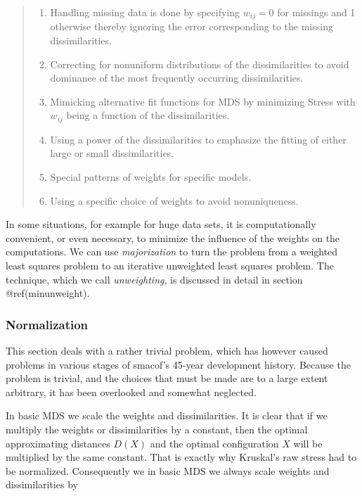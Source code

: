 \documentclass[
  12pt,
  letterpaper,
  DIV=11,
  numbers=noendperiod]{scrreprt}
\providecommand{\tightlist}{%
  \setlength{\itemsep}{0pt}\setlength{\parskip}{0pt}}\usepackage{longtable,booktabs,array}
\theoremstyle{remark}
\begin{document}
\begin{quote}
\begin{enumerate}
\def\labelenumi{\arabic{enumi}.}
\tightlist
\item
  Handling missing data is done by specifying \(w_{ij} = 0\) for
  missings and 1 otherwise thereby ignoring the error corresponding to
  the missing dissimilarities.
\item
  Correcting for nonuniform distributions of the dissimilarities to
  avoid dominance of the most frequently occurring dissimilarities.
\item
  Mimicking alternative fit functions for MDS by minimizing Stress with
  \(w_{ij}\) being a function of the dissimilarities.
\item
  Using a power of the dissimilarities to emphasize the ﬁtting of either
  large or small dissimilarities.
\item
  Special patterns of weights for speciﬁc models.
\item
  Using a speciﬁc choice of weights to avoid nonuniqueness.
\end{enumerate}
\end{quote}

In some situations, for example for huge data sets, it is
computationally convenient, or even necessary, to minimize the influence
of the weights on the computations. We can use \emph{majorization} to
turn the problem from a weighted least squares problem to an iterative
unweighted least squares problem. The technique, which we call
\emph{unweighting}, is discussed in detail in section @ref(minunweight).

\subsubsection{Normalization}\label{intronorm}

This section deals with a rather trivial problem, which has however
caused problems in various stages of smacof's 45-year development
history. Because the problem is trivial, and the choices that must be
made are to a large extent arbitrary, it has been overlooked and
somewhat neglected.

In basic MDS we scale the weights and dissimilarities. It is clear that
if we multiply the weights or dissimilarities by a constant, then the
optimal approximating distances \(D(X)\) and the optimal configuration
\(X\) will be multiplied by the same constant. That is exactly why
Kruskal's raw stress had to be normalized. Consequently we in basic MDS
we always scale weights and dissimilarities by
\end{document}
